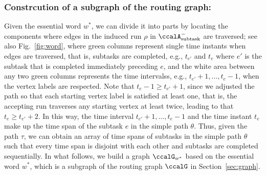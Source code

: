 \documentclass[Afour,sageh,times]{sagej}
\newcommand{\auto}[1]{\ccalA_{\textup{#1}}}
\begin{document}
{{\subsubsection{Constrcution of a subgraph of the routing graph:}\label{app:graph}

Given the essential word $w^*$, we can divide it into parts by locating the components where edges in the induced run $\rho$ in $\auto{subtask}^-$ are traversed; see also Fig.~\ref{fig:word}, where green columns represent single time instants when edges  are traversed, that is, subtasks are completed, e.g., $t_{e'}$ and $t_{e}$ where $e'$ is the subtask that is completed immediately preceding $e$, and the white area between any two green columns represents the time intervalss, e.g., $t_{e'}+1, \ldots, t_{e}-1$, when the vertex labels are respected. Note that $t_{e}-1 \geq t_{e'}+1$, since we adjusted the path so that each starting vertex label is satisfied at least one, that is, the accepting run traverses any starting vertex at least twice, leading to that $t_{e} \geq t_{e'}+2$. In this way,  the time interval $t_{e'}+1, \ldots, t_{e}-1$ and the time instant $t_e$ make up the time span of the  subtask $e$ in the simple path $\theta$. Thus, given the path $\tau$, we can obtain an array of time spans of subtasks in the simple path $\theta$ such that every time span is disjoint with each other and subtasks are completed sequentially. In what follows, we build a graph $\ccalG_{w^*}$ based on the essential word $w^*$, which is a subgraph of the routing graph $\ccalG$ in Section~\ref{sec:graph}.
}}
\end{document}
